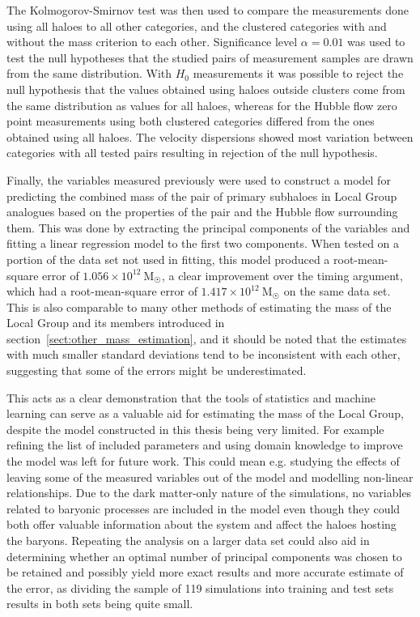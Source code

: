 \documentclass[english, twoside]{HYgradu}
\begin{document}
The Kolmogorov-Smirnov test was then used to compare the measurements done using all haloes to all other categories, and the clustered categories with and without the mass criterion to each other. Significance level $\alpha = 0.01$ was used to test the null hypotheses that the studied pairs of measurement samples are drawn from the same distribution. With $H_0$ measurements it was possible to reject the null hypothesis that the values obtained using haloes outside clusters come from the same distribution as values for all haloes, whereas for the Hubble flow zero point measurements using both clustered categories differed from the ones obtained using all haloes. The velocity dispersions showed most variation between categories with all tested pairs resulting in rejection of the null hypothesis.

Finally, the variables measured previously were used to construct a model for predicting the combined mass of the pair of primary subhaloes in Local Group analogues based on the properties of the pair and the Hubble flow surrounding them. This was done by extracting the principal components of the variables and fitting a linear regression model to the first two components. When tested on a portion of the data set not used in fitting, this model produced a root-mean-square error of $1.056 \times 10^{12}\ \mathrm{M}_{\astrosun}$, a clear improvement over the timing argument, which had a root-mean-square error of $1.417 \times 10^{12}\ \mathrm{M}_{\astrosun}$ on the same data set. This is also comparable to many other methods of estimating the mass of the Local Group and its members introduced in section~\ref{sect:other_mass_estimation}, and it should be noted that the estimates with much smaller standard deviations tend to be inconsistent with each other, suggesting that some of the errors might be underestimated.

This acts as a clear demonstration that the tools of statistics and machine learning can serve as a valuable aid for estimating the mass of the Local Group, despite the model constructed in this thesis being very limited. For example refining the list of included parameters and using domain knowledge to improve the model was left for future work. This could mean e.g. studying the effects of leaving some of the measured variables out of the model and modelling non-linear relationships. Due to the dark matter-only nature of the simulations, no variables related to baryonic processes are included in the model even though they could both offer valuable information about the system and affect the haloes hosting the baryons. Repeating the analysis on a larger data set could also aid in determining whether an optimal number of principal components was chosen to be retained and possibly yield more exact results and more accurate estimate of the error, as dividing the sample of 119 simulations into training and test sets results in both sets being quite small.
\end{document}
